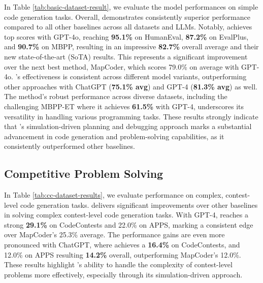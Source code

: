 In Table \ref{tab:basic-dataset-result}, we evaluate the model performances on simple code generation tasks. Overall, \tool demonstrates consistently superior performance compared to all other baselines across all datasets and LLMs. Notably, \tool achieves top scores with GPT-4o, reaching {\bf 95.1\%} on HumanEval, {\bf87.2\%} on EvalPlus, and {\bf90.7\%} on MBPP, resulting in an impressive {\bf82.7\%} overall average and their new state-of-the-art (SoTA)  results. This represents a significant improvement over the next best method, MapCoder, which scores 79.0\% on average with GPT-4o. \toolnospace's effectiveness is consistent across different model variants, outperforming other approaches with ChatGPT ({\bf 75.1\% avg}) and GPT-4 ({\bf 81.3\% avg}) as well. The method's robust performance across diverse datasets, including the challenging MBPP-ET where it achieves {\bf61.5\%} with GPT-4, underscores its versatility in handling various programming tasks. These results strongly indicate that \toolnospace's simulation-driven planning and debugging approach marks a substantial advancement in code generation and problem-solving capabilities, as it consistently outperformed other baselines.



\subsection{ Competitive Problem Solving}

In Table \ref{tab:cc-dataset-results}, we evaluate performance on complex, contest-level code generation tasks. \tool delivers significant improvements over other baselines in solving complex contest-level code generation tasks. With GPT-4, \tool reaches a strong {\bf 29.1\%} on CodeContests and {22.0\%} on APPS, marking a consistent edge over MapCoder’s 25.3\% average. %
The performance gains are even more pronounced with ChatGPT, where \tool achieves a {\bf 16.4\%} on CodeContests, and {12.0\%} on APPS resulting {\bf 14.2\%} overall, outperforming MapCoder’s 12.0\%. These results highlight \toolnospace's ability to handle the complexity of contest-level problems more effectively, especially through its simulation-driven approach. 




